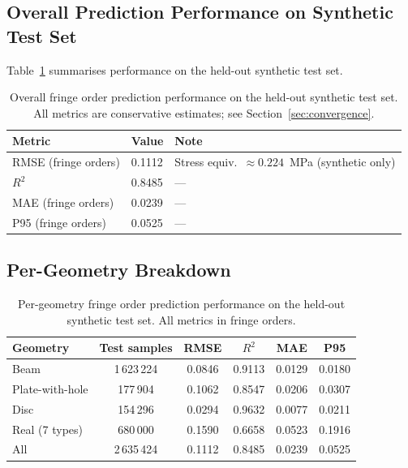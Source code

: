 \documentclass[review,12pt]{elsarticle}
\begin{document}
\subsection{Overall Prediction Performance on Synthetic Test Set}

Table~\ref{tab:overall_performance} summarises performance on the held-out
synthetic test set.

\begin{table}[H]
  \centering
  \caption{Overall fringe order prediction performance on the held-out
    synthetic test set. All metrics are conservative estimates; see
    Section~\ref{sec:convergence}.}
  \label{tab:overall_performance}
  \small
  \begin{tabular}{@{}lll@{}}
    \toprule
    Metric & Value & Note \\
    \midrule
    RMSE (fringe orders) & 0.1112 & Stress equiv.\ $\approx 0.224$~MPa (synthetic only) \\
    $R^2$                & 0.8485 & --- \\
    MAE (fringe orders)  & 0.0239 & --- \\
    P95 (fringe orders)  & 0.0525 & --- \\
    \bottomrule
  \end{tabular}
\end{table}

\subsection{Per-Geometry Breakdown}

\begin{table}[H]
  \centering
  \caption{Per-geometry fringe order prediction performance on the
    held-out synthetic test set. All metrics in fringe orders.}
  \label{tab:per_geometry}
  \small
  \begin{tabular}{@{}lccccc@{}}
    \toprule
    Geometry & Test samples & RMSE & $R^2$ & MAE & P95 \\
    \midrule
    Beam            & 1\,623\,224 & 0.0846 & 0.9113 & 0.0129 & 0.0180 \\
    Plate-with-hole &   177\,904  & 0.1062 & 0.8547 & 0.0206 & 0.0307 \\
    Disc            &   154\,296  & 0.0294 & 0.9632 & 0.0077 & 0.0211 \\
    Real (7 types)  &   680\,000  & 0.1590 & 0.6658 & 0.0523 & 0.1916 \\
    \midrule
    All             & 2\,635\,424 & 0.1112 & 0.8485 & 0.0239 & 0.0525 \\
    \bottomrule
  \end{tabular}
\end{table}
\end{document}
